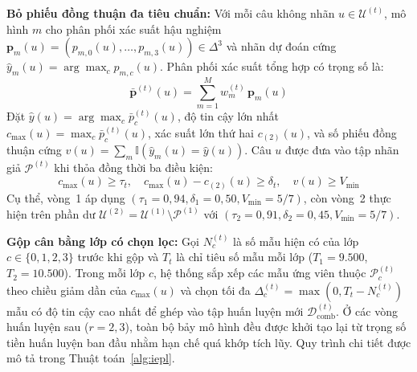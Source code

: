 \documentclass[journal,a4paper]{IEEEtran}
\begin{document}
\textbf{Bỏ phiếu đồng thuận đa tiêu chuẩn:} Với mỗi câu không nhãn $u \in \mathcal{U}^{(t)}$, mô hình $m$ cho phân phối xác suất hậu nghiệm $\mathbf{p}_m(u) = (p_{m,0}(u), \dots, p_{m,3}(u)) \in \Delta^3$ và nhãn dự đoán cứng $\hat{y}_m(u) = \arg\max_c p_{m,c}(u)$. Phân phối xác suất tổng hợp có trọng số là:
\begin{equation}
  \bar{\mathbf{p}}^{(t)}(u) = \sum_{m=1}^{M} w_m^{(t)}\,\mathbf{p}_m(u)
  \label{eq:softprob}
\end{equation}
Đặt $\hat{y}(u) = \arg\max_c \bar{p}_c^{(t)}(u)$, độ tin cậy lớn nhất $c_{\max}(u) = \max_c \bar{p}_c^{(t)}(u)$, xác suất lớn thứ hai $c_{(2)}(u)$, và số phiếu đồng thuận cứng $v(u) = \sum_{m} \mathbb{I}(\hat{y}_m(u) = \hat{y}(u))$. Câu $u$ được đưa vào tập nhãn giả $\mathcal{P}^{(t)}$ khi thỏa đồng thời ba điều kiện:
\begin{equation}
  c_{\max}(u) \ge \tau_t, \quad c_{\max}(u) - c_{(2)}(u) \ge \delta_t, \quad v(u) \ge V_{\min}
  \label{eq:filter}
\end{equation}
Cụ thể, vòng~1 áp dụng $(\tau_1 = 0{,}94, \delta_1 = 0{,}50, V_{\min} = 5/7)$, còn vòng~2 thực hiện trên phần dư $\mathcal{U}^{(2)} = \mathcal{U}^{(1)} \setminus \mathcal{P}^{(1)}$ với $(\tau_2 = 0{,}91, \delta_2 = 0{,}45, V_{\min} = 5/7)$.

\textbf{Gộp cân bằng lớp có chọn lọc:} Gọi $N_c^{(t)}$ là số mẫu hiện có của lớp $c \in \{0,1,2,3\}$ trước khi gộp và $T_t$ là chỉ tiêu số mẫu mỗi lớp ($T_1 = 9.500$, $T_2 = 10.500$). Trong mỗi lớp $c$, hệ thống sắp xếp các mẫu ứng viên thuộc $\mathcal{P}^{(t)}_c$ theo chiều giảm dần của $c_{\max}(u)$ và chọn tối đa $\Delta_c^{(t)} = \max(0, T_t - N_c^{(t)})$ mẫu có độ tin cậy cao nhất để ghép vào tập huấn luyện mới $\mathcal{D}_{\text{comb}}^{(t)}$. Ở các vòng huấn luyện sau ($r=2,3$), toàn bộ bảy mô hình đều được khởi tạo lại từ trọng số tiền huấn luyện ban đầu nhằm hạn chế quá khớp tích lũy. Quy trình chi tiết được mô tả trong Thuật toán~\ref{alg:iepl}.
\end{document}
